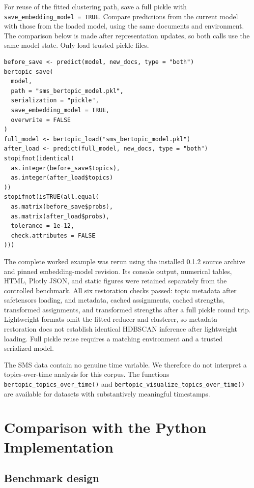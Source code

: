 \documentclass[12pt]{article}
\newcommand{\code}[1]{\texttt{#1}}
\newcommand{\fcode}[1]{\nolinkurl{#1}}
\begin{document}
For reuse of the fitted clustering path, save a full pickle with \fcode{save_embedding_model = TRUE}. Compare predictions from the current model with those from the loaded model, using the same documents and environment. The comparison below is made after representation updates, so both calls use the same model state. Only load trusted pickle files.

\begin{lstlisting}[float=htbp,caption={Saving the complete model and checking post-load predictions.}]
before_save <- predict(model, new_docs, type = "both")
bertopic_save(
  model,
  path = "sms_bertopic_model.pkl",
  serialization = "pickle",
  save_embedding_model = TRUE,
  overwrite = FALSE
)
full_model <- bertopic_load("sms_bertopic_model.pkl")
after_load <- predict(full_model, new_docs, type = "both")
stopifnot(identical(
  as.integer(before_save$topics),
  as.integer(after_load$topics)
))
stopifnot(isTRUE(all.equal(
  as.matrix(before_save$probs),
  as.matrix(after_load$probs),
  tolerance = 1e-12,
  check.attributes = FALSE
)))
\end{lstlisting}

The complete worked example was rerun using the installed 0.1.2 source archive and pinned embedding-model revision. Its console output, numerical tables, HTML, Plotly JSON, and static figures were retained separately from the controlled benchmark. All six restoration checks passed: topic metadata after safetensors loading, and metadata, cached assignments, cached strengths, transformed assignments, and transformed strengths after a full pickle round trip. Lightweight formats omit the fitted reducer and clusterer, so metadata restoration does not establish identical HDBSCAN inference after lightweight loading. Full pickle reuse requires a matching environment and a trusted serialized model.

The SMS data contain no genuine time variable. We therefore do not interpret a topics-over-time analysis for this corpus. The functions \code{bertopic\_topics\_over\_time()} and \code{bertopic\_visualize\_topics\_over\_time()} are available for datasets with substantively meaningful timestamps.

\section{Comparison with the Python Implementation}
\label{sec:evaluation}

\subsection{Benchmark design}
\end{document}
